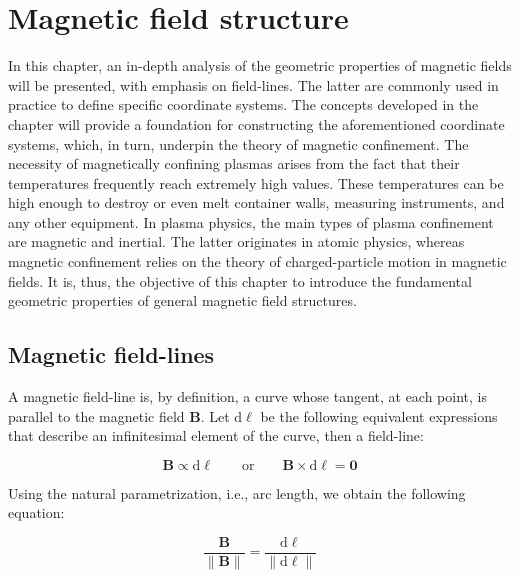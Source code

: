 
\chapter{Magnetic field structure}

\label{magnetic-field-structure}

In this chapter, an in-depth analysis of the geometric properties of magnetic fields will be presented, with emphasis on field-lines. The latter are commonly used in practice to define specific coordinate systems. The concepts developed in the chapter will provide a foundation for constructing the aforementioned coordinate systems, which, in turn, underpin the theory of magnetic confinement. The necessity of magnetically confining plasmas arises from the fact that their temperatures frequently reach extremely high values. These temperatures can be high enough to destroy or even melt container walls, measuring instruments, and any other equipment. In plasma physics, the main types of plasma confinement are magnetic and inertial. The latter originates in atomic physics, whereas magnetic confinement relies on the theory of charged-particle motion in magnetic fields. It is, thus, the objective of this chapter to introduce the fundamental geometric properties of general magnetic field structures.

\section{Magnetic field-lines}

A magnetic field-line is, by definition, a curve whose tangent, at each point, is parallel to the magnetic field $\mathbf{B}$. Let $\mathrm{d}\boldsymbol{\ell}$ be the following equivalent expressions that describe an infinitesimal element of the curve, then a field-line:

\begin{equation}
    \mathbf{B}\propto\mathrm{d}\boldsymbol{\ell}\quad\quad \text{or}\quad\quad\mathbf{B}\times\mathrm{d}\boldsymbol{\ell}=\mathbf{0}
\end{equation}

Using the natural parametrization, i.e., arc length, we obtain the following equation:

\begin{equation}
    \label{eq-6-2}
    \frac{\mathbf{B}}{\|\mathbf{B}\|}=\frac{\mathrm{d}\boldsymbol{\ell}}{\|\mathrm{d}\boldsymbol{\ell}\|}
\end{equation}

